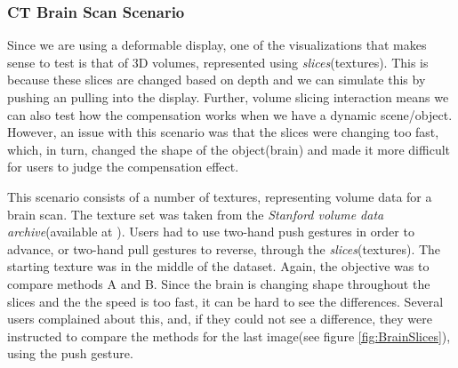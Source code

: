 \documentclass[]{article}
\begin{document}
\subsubsection{CT Brain Scan Scenario}

Since we are using a deformable display, one of the visualizations that makes sense to test is that of 3D volumes, represented using \textit{slices}(textures). This is because these slices are changed based on depth and we can simulate this by pushing an pulling into the display. Further, volume slicing interaction means we can also test how the compensation works when we have a dynamic scene/object. However, an issue with this scenario was that the slices were changing too fast, which, in turn, changed the shape of the object(brain) and made it more difficult for users to judge the compensation effect.

This scenario consists of a number of textures, representing volume data for a brain scan. The texture set was taken from the \textit{Stanford volume data archive}(available at \cite{levoy2001}). Users had to use two-hand push gestures in order to advance, or two-hand pull gestures to reverse, through the \textit{slices}(textures). The starting texture was in the middle of the dataset. Again, the objective was to compare methods A and B. Since the brain is changing shape throughout the slices and the the speed is too fast, it can be hard to see the differences. Several users complained about this, and, if they could not see a difference, they were instructed to compare the methods for the last image(see figure \ref{fig:BrainSlices}), using the push gesture.
\end{document}
